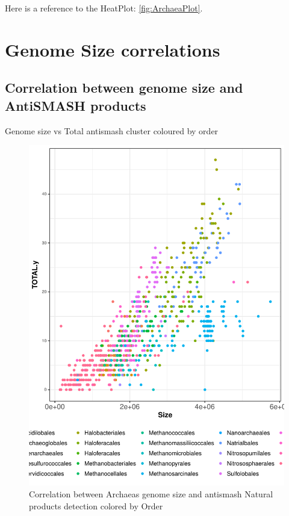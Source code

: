 \documentclass[12pt,twoside]{reedthesis}
\begin{document}
  Here is a reference to the HeatPlot: \autoref{fig:ArchaeaPlot}.
  \clearpage 
  
  \section{Genome Size correlations}\label{genome-size-correlations}
  
  \subsection{Correlation between genome size and AntiSMASH
  products}\label{correlation-between-genome-size-and-antismash-products}
  
  Genome size vs Total antismash cluster coloured by order
  
  \begin{figure}[h!tbp]
  \centering
  \includegraphics[angle = 0,scale = 0.6]{chapter3/ArchaeasSMASHvsSizebyOrder.pdf}
  \caption[Correlation between Archaeas genome size and antismash Natural products detection colored by Order]{\normalsize{Correlation between Archaeas genome size and antismash Natural products detection colored by Order}}
  \label{fig:ArchaeasSMASHvsSizebyOrder}
  \end{figure}
  
\end{document}
